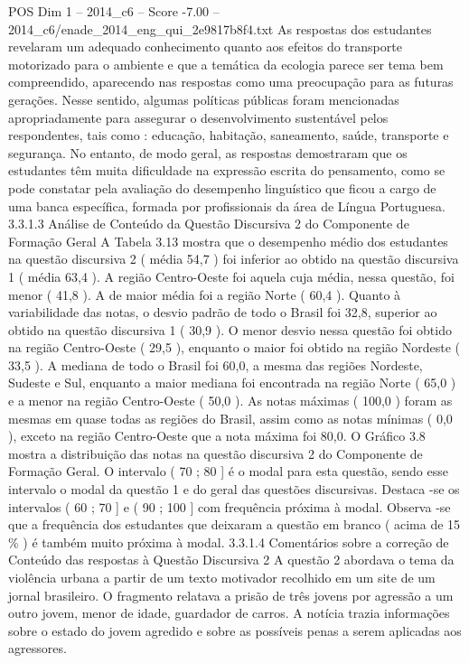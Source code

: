 \begin{textsample}{POS Dim 1 – 2014\_c6 – Score -7.00 – 2014\_c6/enade\_2014\_eng\_qui\_2e9817b8f4.txt}
As respostas dos estudantes revelaram um adequado conhecimento quanto aos efeitos do transporte motorizado para o ambiente e que a temática da ecologia parece ser tema bem compreendido, aparecendo nas respostas como uma preocupação para as futuras gerações.
Nesse sentido, algumas políticas públicas foram mencionadas apropriadamente para assegurar o desenvolvimento sustentável pelos respondentes, tais como : educação, habitação, saneamento, saúde, transporte e segurança.
No entanto, de modo geral, as respostas demostraram que os estudantes têm muita dificuldade na expressão escrita do pensamento, como se pode constatar pela avaliação do desempenho linguístico que ficou a cargo de uma banca específica, formada por profissionais da área de Língua Portuguesa. 3.3.1.3 Análise de Conteúdo da Questão Discursiva 2 do Componente de Formação Geral A Tabela 3.13 mostra que o desempenho médio dos estudantes na questão discursiva 2 ( média 54,7 ) foi inferior ao obtido na questão discursiva 1 ( média 63,4 ).
A região Centro-Oeste foi aquela cuja média, nessa questão, foi menor ( 41,8 ).
A de maior média foi a região Norte ( 60,4 ).
Quanto à variabilidade das notas, o desvio padrão de todo o Brasil foi 32,8, superior ao obtido na questão discursiva 1 ( 30,9 ).
O menor desvio nessa questão foi obtido na região Centro-Oeste ( 29,5 ), enquanto o maior foi obtido na região Nordeste ( 33,5 ).
A mediana de todo o Brasil foi 60,0, a mesma das regiões Nordeste, Sudeste e Sul, enquanto a maior mediana foi encontrada na região Norte ( 65,0 ) e a menor na região Centro-Oeste ( 50,0 ).
As notas máximas ( 100,0 ) foram as mesmas em quase todas as regiões do Brasil, assim como as notas mínimas ( 0,0 ), exceto na região Centro-Oeste que a nota máxima foi 80,0.
O Gráfico 3.8 mostra a distribuição das notas na questão discursiva 2 do Componente de Formação Geral.
O intervalo ( 70 ; 80 ] é o modal para esta questão, sendo esse intervalo o modal da questão 1 e do geral das questões discursivas.
Destaca -se os intervalos ( 60 ; 70 ] e ( 90 ; 100 ] com frequência próxima à modal.
Observa -se que a frequência dos estudantes que deixaram a questão em branco ( acima de 15 \% ) é também muito próxima à modal. 3.3.1.4 Comentários sobre a correção de Conteúdo das respostas à Questão Discursiva 2 A questão 2 abordava o tema da violência urbana a partir de um texto motivador recolhido em um site de um jornal brasileiro.
O fragmento relatava a prisão de três jovens por agressão a um outro jovem, menor de idade, guardador de carros.
A notícia trazia informações sobre o estado do jovem agredido e sobre as possíveis penas a serem aplicadas aos agressores.

\end{textsample}
